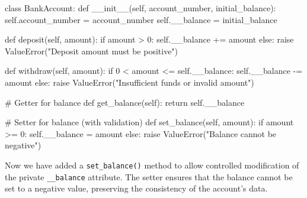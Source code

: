 \documentclass[
  letterpaper,
  DIV=11,
  numbers=noendperiod]{scrreprt}
\newenvironment{Shaded}{\begin{snugshade}}{\end{snugshade}}
\newcommand{\CommentTok}[1]{\textcolor[rgb]{0.37,0.37,0.37}{#1}}
\newcommand{\ControlFlowTok}[1]{\textcolor[rgb]{0.00,0.23,0.31}{#1}}
\newcommand{\DecValTok}[1]{\textcolor[rgb]{0.68,0.00,0.00}{#1}}
\newcommand{\FunctionTok}[1]{\textcolor[rgb]{0.28,0.35,0.67}{#1}}
\newcommand{\KeywordTok}[1]{\textcolor[rgb]{0.00,0.23,0.31}{#1}}
\newcommand{\NormalTok}[1]{\textcolor[rgb]{0.00,0.23,0.31}{#1}}
\newcommand{\OperatorTok}[1]{\textcolor[rgb]{0.37,0.37,0.37}{#1}}
\newcommand{\PreprocessorTok}[1]{\textcolor[rgb]{0.68,0.00,0.00}{#1}}
\newcommand{\StringTok}[1]{\textcolor[rgb]{0.13,0.47,0.30}{#1}}
\newcommand{\VariableTok}[1]{\textcolor[rgb]{0.07,0.07,0.07}{#1}}
\begin{document}
\begin{Shaded}
\begin{Highlighting}[]
\KeywordTok{class}\NormalTok{ BankAccount:}
    \KeywordTok{def} \FunctionTok{\_\_init\_\_}\NormalTok{(}\VariableTok{self}\NormalTok{, account\_number, initial\_balance):}
        \VariableTok{self}\NormalTok{.account\_number }\OperatorTok{=}\NormalTok{ account\_number}
        \VariableTok{self}\NormalTok{.\_\_balance }\OperatorTok{=}\NormalTok{ initial\_balance}

    \KeywordTok{def}\NormalTok{ deposit(}\VariableTok{self}\NormalTok{, amount):}
        \ControlFlowTok{if}\NormalTok{ amount }\OperatorTok{\textgreater{}} \DecValTok{0}\NormalTok{:}
            \VariableTok{self}\NormalTok{.\_\_balance }\OperatorTok{+=}\NormalTok{ amount}
        \ControlFlowTok{else}\NormalTok{:}
            \ControlFlowTok{raise} \PreprocessorTok{ValueError}\NormalTok{(}\StringTok{"Deposit amount must be positive"}\NormalTok{)}

    \KeywordTok{def}\NormalTok{ withdraw(}\VariableTok{self}\NormalTok{, amount):}
        \ControlFlowTok{if} \DecValTok{0} \OperatorTok{\textless{}}\NormalTok{ amount }\OperatorTok{\textless{}=} \VariableTok{self}\NormalTok{.\_\_balance:}
            \VariableTok{self}\NormalTok{.\_\_balance }\OperatorTok{{-}=}\NormalTok{ amount}
        \ControlFlowTok{else}\NormalTok{:}
            \ControlFlowTok{raise} \PreprocessorTok{ValueError}\NormalTok{(}\StringTok{"Insufficient funds or invalid amount"}\NormalTok{)}

    \CommentTok{\# Getter for balance}
    \KeywordTok{def}\NormalTok{ get\_balance(}\VariableTok{self}\NormalTok{):}
        \ControlFlowTok{return} \VariableTok{self}\NormalTok{.\_\_balance}

    \CommentTok{\# Setter for balance (with validation)}
    \KeywordTok{def}\NormalTok{ set\_balance(}\VariableTok{self}\NormalTok{, amount):}
        \ControlFlowTok{if}\NormalTok{ amount }\OperatorTok{\textgreater{}=} \DecValTok{0}\NormalTok{:}
            \VariableTok{self}\NormalTok{.\_\_balance }\OperatorTok{=}\NormalTok{ amount}
        \ControlFlowTok{else}\NormalTok{:}
            \ControlFlowTok{raise} \PreprocessorTok{ValueError}\NormalTok{(}\StringTok{"Balance cannot be negative"}\NormalTok{)}
\end{Highlighting}
\end{Shaded}

Now we have added a \texttt{set\_balance()} method to allow controlled
modification of the private \texttt{\_\_balance} attribute. The setter
ensures that the balance cannot be set to a negative value, preserving
the consistency of the account's data.
\end{document}
